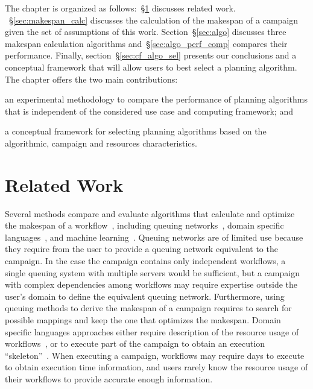 The chapter is organized as follows:~\S\ref{sec:camp_rw} discusses related
work. ~\S\ref{sec:makespan_calc} discusses the
calculation of the makespan of a campaign given the set of assumptions of this
work. Section~\S\ref{sec:algo} discusses three makespan calculation algorithms
and~\S\ref{sec:algo_perf_comp} compares their performance. Finally,
section~\S\ref{sec:cf_algo_sel} presents our conclusions and a conceptual
framework that will allow users to best select a planning algorithm. The chapter
offers the two main contributions:
\begin{inparaenum}[(i)]
    \item an experimental methodology to compare the performance of planning
    algorithms that is independent of the considered use case and computing
    framework; and
    \item a conceptual framework for selecting planning algorithms based on the
    algorithmic, campaign and resources characteristics.
\end{inparaenum}


\section{Related Work}
\label{sec:camp_rw}
Several methods compare and evaluate algorithms that calculate and optimize the
makespan of a workflow~\cite{lu2019review}, including queuing
networks~\cite{yao2019throughput,bao2019performance}, domain specific
languages~\cite{carothers2017durango,maheshwari2016workflow}, and machine
learning~\cite{witt2019predictive,pumma2017runtime}. Queuing networks are of
limited use because they require from the user to provide a queuing network
equivalent to the campaign. In the case the campaign contains only independent
workflows, a single queuing system with multiple servers would be sufficient,
but a campaign with complex dependencies among workflows may require expertise
outside the user's domain to define the equivalent queuing network. Furthermore,
using queuing methods to derive the makespan of a campaign requires to search
for possible mappings and keep the one that optimizes the makespan. Domain
specific languages approaches either require description of the resource usage
of workflows~\cite{carothers2017durango}, or to execute part of the campaign to
obtain an execution ``skeleton''~\cite{maheshwari2016workflow}.
When executing a campaign, workflows may require days to execute to obtain
execution time information, and users rarely know the resource usage of their
workflows to provide accurate enough information.

